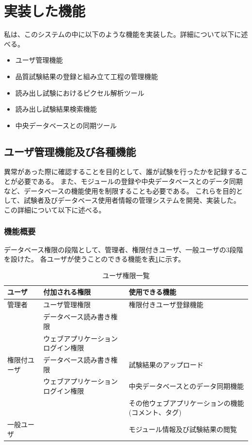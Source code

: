 \section{実装した機能}
私は、このシステムの中に以下のような機能を実装した。詳細について以下に述べる。
\begin{itemize}
  \item ユーザ管理機能
  \item 品質試験結果の登録と組み立て工程の管理機能
  \item 読み出し試験におけるピクセル解析ツール
  \item 読み出し試験結果検索機能
  \item 中央データベースとの同期ツール
\end{itemize}

\subsection{ユーザ管理機能及び各種機能}

異常があった際に確認することを目的として、誰が試験を行ったかを記録することが必要である。
また、モジュールの登録や中央データベースとのデータ同期など、データベースの機能使用を制限することも必要である。
これらを目的として、試験者及びデータベース使用者情報の管理システムを開発、実装した。
この詳細について以下に述べる。

\subsubsection{機能概要}
データベース権限の段階として、管理者、権限付きユーザ、一般ユーザの3段階を設けた。
各ユーザが使うことのできる機能を表\ref{user_functions_summary}に示す。

\begin{table}[tbp]
\begin{center}
\caption[ユーザ権限一覧]{ユーザ権限一覧}
\label{user_functions_summary}
  \begin{tabular}{|lll|} \hline
    ユーザ       & 付加される権限                               & 使用できる機能 \\ \hline
    管理者       & ユーザ管理権限                     & 権限付きユーザ登録機能\\ 
                 & データベース読み書き権限           & \\ 
                 & ウェブアプリケーションログイン権限 & \\ \hline
    権限付ユーザ & データベース読み書き権限           & 試験結果のアップロード\\ 
                 & ウェブアプリケーションログイン権限 & 中央データベースとのデータ同期機能\\ 
                 &                                    & その他ウェブアプリケーションの機能(コメント、タグ)\\ \hline
    一般ユーザ   &                                    & モジュール情報及び試験結果の閲覧　\\ \hline
  \end{tabular}
\end{center}
\end{table}

